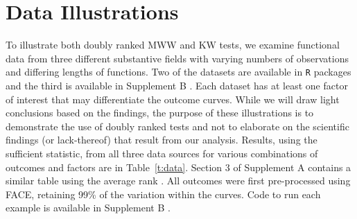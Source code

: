 \documentclass[12pt]{article}
\theoremstyle{plain}
\theoremstyle{remark}
\begin{document}

\section{Data Illustrations}
\label{s:app}

To illustrate both doubly ranked MWW and KW tests, we examine functional data from three different substantive fields with varying numbers of observations and differing lengths of functions. Two of the datasets are available in \texttt{R} packages and the third is available in Supplement B \citep{DRTSup2024B}. Each dataset has at least one factor of interest that may differentiate the outcome curves. While we will draw light conclusions based on the findings, the purpose of these illustrations is to demonstrate the use of doubly ranked tests and not to elaborate on the scientific findings (or lack-thereof) that result from our analysis. Results, using the sufficient statistic, from all three data sources for various combinations of outcomes and factors are in Table~\ref{t:data}. Section 3 of Supplement A contains a similar table using the average rank \citep{DRTSup2024A}. All outcomes were first pre-processed using FACE, retaining 99\% of the variation within the curves. Code to run each example is available in Supplement B \citep{DRTSup2024B}.
\end{document}
